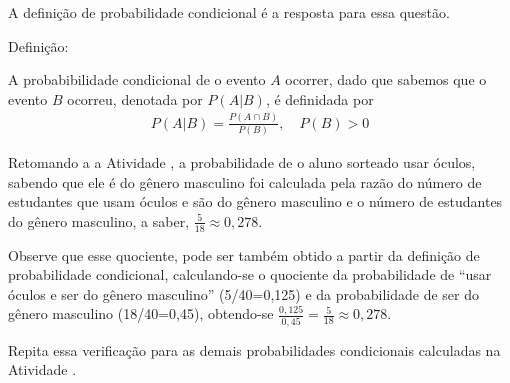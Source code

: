 A definição de probabilidade condicional é a resposta para essa questão.

\begin{observation}{Definição:}

A probabibilidade condicional de o evento \(A\) ocorrer, dado que sabemos que o evento \(B\)  ocorreu, denotada por \(P(A|B)\),  é definidada por
\begin{equation*}
\begin{split}P(A|B)=\frac{P(A\cap B)}{P(B)}, \quad P(B)>0\end{split}
\end{equation*}\end{observation}

Retomando a a Atividade , a probabilidade de o aluno sorteado usar óculos, sabendo que ele é do gênero masculino foi calculada pela razão do número de estudantes que usam óculos e são do gênero masculino e o número de estudantes do gênero masculino, a saber, \(\frac{5}{18}\approx 0,278\).

Observe que esse quociente, pode ser também obtido a partir da definição de probabilidade condicional, calculando-se o quociente da probabilidade de “usar óculos e ser do gênero masculino” (5/40=0,125) e da probabilidade de ser do gênero masculino (18/40=0,45), obtendo-se \(\frac{0,125}{0,45}=\frac{5}{18}\approx 0,278\).

Repita essa verificação para as demais probabilidades condicionais calculadas na Atividade .

